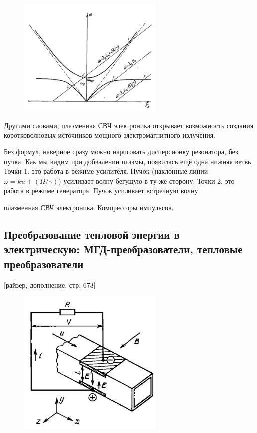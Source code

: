 \documentclass[10pt, a4paper]{article}
\begin{document}
\begin{figure}[ht]
	\begin{center}
		\includegraphics[width=70mm]{dispers_14_3.JPG}
	\end{center}
\end{figure}

Другими словами, плазменная СВЧ электроника открывает возможиость создания коротковолновых источников мощного электромагнитного излучения.


Без формул, наверное сразу можно нарисовать дисперсионку резонатора, без пучка.  Как мы видим при добвалении плазмы, появилась ещё одна нижняя ветвь. Точки 1. это работа в режиме усилителя. Пучок (наклонные линии $\omega=ku\pm (\Omega/\gamma)$) усиливает волну бегущую в ту же сторону. Точки 2. это работа в режиме генератора. Пучок усиливает встречную волну.



плазменная СВЧ электроника.
Компрессоры импульсов.


\subsection{Преобразование тепловой энергии в электрическую: МГД-преобразователи, тепловые преобразователи}

[райзер, дополнение, стр. 673]

\begin{figure}[ht]
	\begin{center}
		\includegraphics[width=70mm]{MGD_generator.JPG}
	\end{center}
\end{figure}
\end{document}

